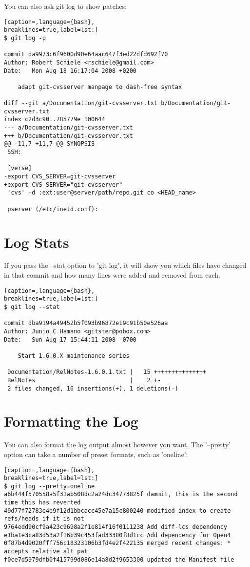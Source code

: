You can also ask git log to show patches:
\lstset{basicstyle=\scriptsize, numbers=none, captionpos=b, tabsize=4}
\begin{lstlisting}[caption=,language={bash},
breaklines=true,label=lst:]
$ git log -p

commit da9973c6f9600d90e64aac647f3ed22dfd692f70
Author: Robert Schiele <rschiele@gmail.com>
Date:   Mon Aug 18 16:17:04 2008 +0200

    adapt git-cvsserver manpage to dash-free syntax

diff --git a/Documentation/git-cvsserver.txt b/Documentation/git-cvsserver.txt
index c2d3c90..785779e 100644
--- a/Documentation/git-cvsserver.txt
+++ b/Documentation/git-cvsserver.txt
@@ -11,7 +11,7 @@ SYNOPSIS
 SSH:

 [verse]
-export CVS_SERVER=git-cvsserver
+export CVS_SERVER="git cvsserver"
 'cvs' -d :ext:user@server/path/repo.git co <HEAD_name>

 pserver (/etc/inetd.conf):
\end{lstlisting}

\section{Log Stats}
If you pass the --stat option to 'git log', it will show you which files have
changed in that commit and how many lines were added and removed from each.
\lstset{basicstyle=\scriptsize, numbers=none, captionpos=b, tabsize=4}
\begin{lstlisting}[caption=,language={bash},
breaklines=true,label=lst:]
$ git log --stat

commit dba9194a49452b5f093b96872e19c91b50e526aa
Author: Junio C Hamano <gitster@pobox.com>
Date:   Sun Aug 17 15:44:11 2008 -0700

    Start 1.6.0.X maintenance series

 Documentation/RelNotes-1.6.0.1.txt |   15 +++++++++++++++
 RelNotes                           |    2 +-
 2 files changed, 16 insertions(+), 1 deletions(-)
\end{lstlisting}

\section{Formatting the Log}
You can also format the log output almost however you want. The '--pretty'
option can take a number of preset formats, such as 'oneline':
\lstset{basicstyle=\scriptsize, numbers=none, captionpos=b, tabsize=4}
\begin{lstlisting}[caption=,language={bash},
breaklines=true,label=lst:]
$ git log --pretty=oneline
a6b444f570558a5f31ab508dc2a24dc34773825f dammit, this is the second time this has reverted
49d77f72783e4e9f12d1bbcacc45e7a15c800240 modified index to create refs/heads if it is not 
9764edd90cf9a423c9698a2f1e814f16f0111238 Add diff-lcs dependency
e1ba1e3ca83d53a2f16b39c453fad33380f8d1cc Add dependency for Open4
0f87b4d9020fff756c18323106b3fd4e2f422135 merged recent changes: * accepts relative alt pat
f0ce7d5979dfb0f415799d086e14a8d2f9653300 updated the Manifest file
\end{lstlisting}

